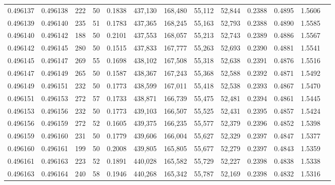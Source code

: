 \begin{tabular}{rrrrrrrrrrrrr}
0.496137 & 0.496138 &   222 &  50 &                                     0.1838 & 437,130 & 168,480 &  55,112 &  52,844 & 0.2388 & 0.4895 & 1.5606 \\
0.496139 & 0.496140 &   235 &  51 &                                     0.1783 & 437,365 & 168,245 &  55,163 &  52,793 & 0.2388 & 0.4890 & 1.5585 \\
0.496140 & 0.496142 &   188 &  50 &                                     0.2101 & 437,553 & 168,057 &  55,213 &  52,743 & 0.2389 & 0.4886 & 1.5567 \\
0.496142 & 0.496145 &   280 &  50 &                                     0.1515 & 437,833 & 167,777 &  55,263 &  52,693 & 0.2390 & 0.4881 & 1.5541 \\
0.496145 & 0.496147 &   269 &  55 &                                     0.1698 & 438,102 & 167,508 &  55,318 &  52,638 & 0.2391 & 0.4876 & 1.5516 \\
0.496147 & 0.496149 &   265 &  50 &                                     0.1587 & 438,367 & 167,243 &  55,368 &  52,588 & 0.2392 & 0.4871 & 1.5492 \\
0.496149 & 0.496151 &   232 &  50 &                                     0.1773 & 438,599 & 167,011 &  55,418 &  52,538 & 0.2393 & 0.4867 & 1.5470 \\
0.496151 & 0.496153 &   272 &  57 &                                     0.1733 & 438,871 & 166,739 &  55,475 &  52,481 & 0.2394 & 0.4861 & 1.5445 \\
0.496153 & 0.496156 &   232 &  50 &                                     0.1773 & 439,103 & 166,507 &  55,525 &  52,431 & 0.2395 & 0.4857 & 1.5424 \\
0.496156 & 0.496159 &   272 &  52 &                                     0.1605 & 439,375 & 166,235 &  55,577 &  52,379 & 0.2396 & 0.4852 & 1.5398 \\
0.496159 & 0.496160 &   231 &  50 &                                     0.1779 & 439,606 & 166,004 &  55,627 &  52,329 & 0.2397 & 0.4847 & 1.5377 \\
0.496160 & 0.496161 &   199 &  50 &                                     0.2008 & 439,805 & 165,805 &  55,677 &  52,279 & 0.2397 & 0.4843 & 1.5359 \\
0.496161 & 0.496163 &   223 &  52 &                                     0.1891 & 440,028 & 165,582 &  55,729 &  52,227 & 0.2398 & 0.4838 & 1.5338 \\
0.496163 & 0.496164 &   240 &  58 &                                     0.1946 & 440,268 & 165,342 &  55,787 &  52,169 & 0.2398 & 0.4832 & 1.5316 \\

\end{tabular}
